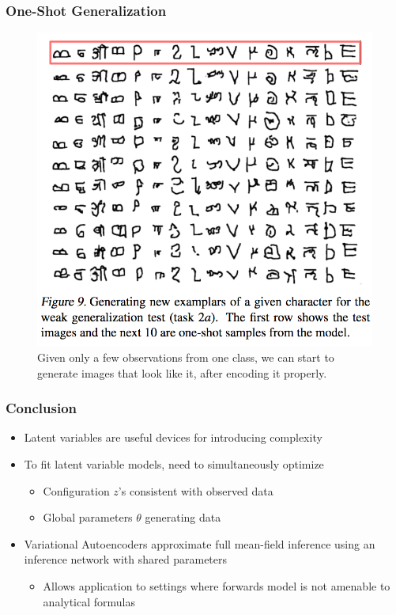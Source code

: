 \documentclass[10pt,mathserif]{beamer}
\begin{document}
\begin{frame}
  \frametitle{One-Shot Generalization}
  \begin{figure}[ht]
  \centering
  \includegraphics[width=0.5\paperwidth]{figure/vae_omniglot}
  \caption{Given only a few observations from one class, we can start to
    generate images that look like it, after encoding it properly.}
\end{figure}
\end{frame}

\begin{frame}
  \frametitle{Conclusion}
  \begin{itemize}
  \item Latent variables are useful devices for introducing complexity
  \item To fit latent variable models, need to simultaneously optimize
    \begin{itemize}
    \item Configuration $z$'s consistent with observed data
    \item Global parameters $\theta$ generating data
    \end{itemize}
  \item Variational Autoencoders approximate full mean-field inference using an
    inference network with shared parameters
    \begin{itemize}
    \item Allows application to settings where forwards model is not amenable to
      analytical formulas
    \end{itemize}
  \end{itemize} 
\end{frame}
\end{document}
